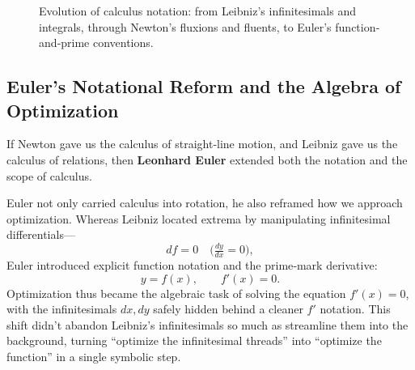 \begin{figure}[H]
    \centering
    \caption{Evolution of calculus notation: from Leibniz’s infinitesimals and integrals, through Newton’s fluxions and fluents, to Euler’s function‐and‐prime conventions.}
    \label{fig:calculus-notation-evolution}
\end{figure}
  


\subsection{Euler’s Notational Reform and the Algebra of Optimization}


If Newton gave us the calculus of straight‐line motion, and Leibniz gave us the calculus of relations, then \textbf{Leonhard Euler} extended both the notation and the scope of calculus.

Euler not only carried calculus into rotation, he also reframed how we approach optimization.  Whereas Leibniz located extrema by manipulating infinitesimal differentials—
\[
df = 0\quad\bigl(\tfrac{dy}{dx}=0\bigr),
\]
Euler introduced explicit function notation and the prime‐mark derivative:
\[
y = f(x),\qquad f'(x) = 0.
\]
Optimization thus became the algebraic task of solving the equation \(f'(x)=0\), with the infinitesimals \(dx, dy\) safely hidden behind a cleaner \(f'\) notation.  This shift didn’t abandon Leibniz’s infinitesimals so much as streamline them into the background, turning “optimize the infinitesimal threads” into “optimize the function” in a single symbolic step.

